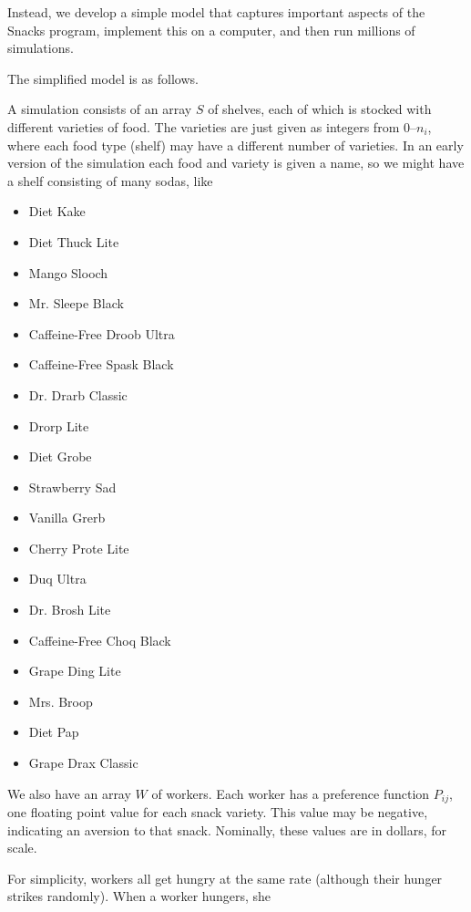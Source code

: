 \documentclass[twocolumn]{article}
\begin{document}
Instead, we develop a simple model that captures important aspects of the Snacks program, implement this on a computer, and then run millions of simulations.

The simplified model is as follows.

A simulation consists of an array $S$ of shelves, each of which is stocked with different varieties of food. The varieties are just given as integers from 0--$n_i$, where each food type (shelf) may have a different number of varieties. In an early version of the simulation each food and variety is given a name, so we might have a shelf consisting of many sodas, like

\begin{itemize}
\item Diet Kake 
\item Diet Thuck Lite
\item Mango Slooch 
\item Mr. Sleepe Black
\item Caffeine-Free Droob Ultra
\item Caffeine-Free Spask Black
\item Dr. Drarb Classic
\item Drorp Lite
\item Diet Grobe
\item Strawberry Sad 
\item Vanilla Grerb
\item Cherry Prote Lite
\item Duq Ultra
\item Dr. Brosh Lite
\item Caffeine-Free Choq Black
\item Grape Ding Lite
\item Mrs. Broop 
\item Diet Pap 
\item Grape Drax Classic
\end{itemize}

We also have an array $W$ of workers. Each worker has a preference function $P_{ij}$, one floating point value for each snack variety. This value may be negative, indicating an aversion to that snack. Nominally, these values are in dollars, for scale.

For simplicity, workers all get hungry at the same rate (although their hunger strikes randomly). When a worker hungers, she
\end{document}
